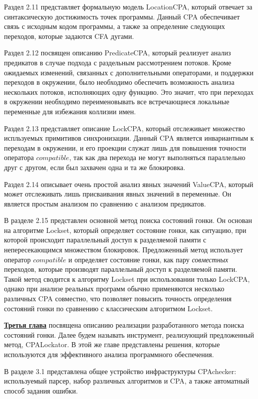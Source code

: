 Раздел 2.11 представляет формальную модель LocationCPA, который отвечает за синтаксическую достижимость точек программы.
Данный CPA обеспечивает связь с исходным кодом программы, а также за определение следующих переходов, которые задаются CFA дугами.

Раздел 2.12 посвящен описанию PredicateCPA, который реализует анализ предикатов в случае подхода с раздельным рассмотрением потоков.
Кроме ожидаемых изменений, связанных с дополнительными операторами, и поддержки переходов в окружении, было необходимо обеспечить возможность анализа нескольких потоков, исполняющих одну функцию. 
Это значит, что при переходах в окружении необходимо переименовывать все встречающиеся локальные переменные для избежания коллизии имен.

Раздел 2.13 представляет описание LockCPA, который отслеживает множество испльзуемых примитивов синхронизации.
Данный CPA является инвариантным к переходам в окружении, и его проекции служат лишь для повышения точности оператора $compatible$, так как два перехода не могут выполняться параллельно друг с другом, если был захвачен одна и та же блокировка.

Раздел 2.14 описывает очень простой анализ явных значений ValueCPA, который может отслеживать лишь присваивания явных значений в переменные.
Он является простым анализом по сравнению с анализом предикатов.

В разделе 2.15 представлен основной метод поиска состояний гонки. 
Он основан на алгоритме Lockset, который определяет состояние гонки, как ситуацию, при которой происходит параллельный доступ к разделяемой памяти с непересекающимся множеством блокировок.
Предложенный метод использует оператор $compatible$ и определяет состояние гонки, как пару \textit{совместных} переходов, которые производят параллельный доступ к разделяемой памяти.
Такой метод сводится к алгоритму Lockset при использовании только LockCPA, однако при анализе реальных программ обычно применяются несколько различных CPA совместно, что позволяет повысить точность определения состояний гонки по сравнению с классическим алгоритмом Lockset.

\underline{\textbf{Третья глава}} посвящена описанию реализации разработанного метода поиска состояний гонки.
Далее будем называть инструмент, реализующий предложенный метод, CPALockator.
В этой же главе представлены решения, которые используются для эффективного анализа программного обеспечения.

В разделе 3.1 представлена общее устройство инфраструктуры CPAchecker: используемый парсер, набор различных алгоритмов и CPA, а также автоматный способ задания ошибки.

